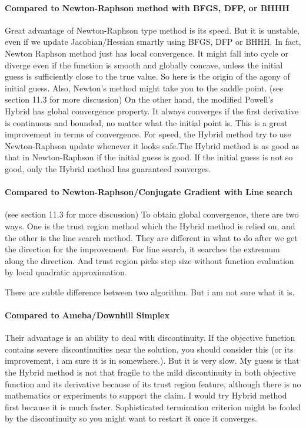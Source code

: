 \documentclass[12pt]{article}
\begin{document}
\paragraph{Compared to Newton-Raphson method with BFGS, DFP, or BHHH} Great advantage of
Newton-Raphson type method is its speed. But it is unstable, even if we update Jacobian/Hessian
smartly using BFGS, DFP or BHHH. In fact, Newton Raphson method just has local convergence. It
might fall into cycle or diverge even if the function is smooth and globally concave, unless the
initial guess is sufficiently close to the true value. So here is the origin of the agony of
initial guess. Also, Newton's method might take you to the saddle point. (see
\cite{BjorckDahlquist2008} section 11.3 for more discussion) On the other hand, the modified
Powell's Hybrid has global convergence property. It always converges if the first derivative is
continuous and bounded, no matter what the initial point is. This is a great improvement in terms
of convergence. For speed, the Hybrid method try to use Newton-Raphson update whenever it looks
safe.The Hybrid method is as good as that in Newton-Raphson if the initial guess is good. If the
initial guess is not so good, only the Hybrid method has guaranteed converges.

\paragraph{Compared to Newton-Raphson/Conjugate Gradient with Line search} 
(see \cite{BjorckDahlquist2008} section 11.3 for more discussion) To obtain global convergence,
there are two ways. One is the trust region method which the Hybrid method is relied on, and the
other is the line search method. They are different in what to do after we get the direction for
the improvement. For line search, it searches the extremum along the direction. And trust region
picks step size without function evaluation by local quadratic approximation.

There are subtle difference between two algorithm. But i am not sure what it is. 

\paragraph{Compared to Ameba/Downhill Simplex } Their advantage is an ability to deal with
discontinuity. If the objective function contains severe discontinuities near the solution, you
should consider this (or its improvement, i am sure it is in somewhere.). But it is very slow. My
guess is that the Hybrid method is not that fragile to the mild discontinuity in both objective
function and its derivative because of its trust region feature, although there is no mathematics
or experiments to support the claim. I would try Hybrid method first because it is much
faster. Sophisticated termination criterion might be fooled by the discontinuity so you might want
to restart it once it converges.
\end{document}
